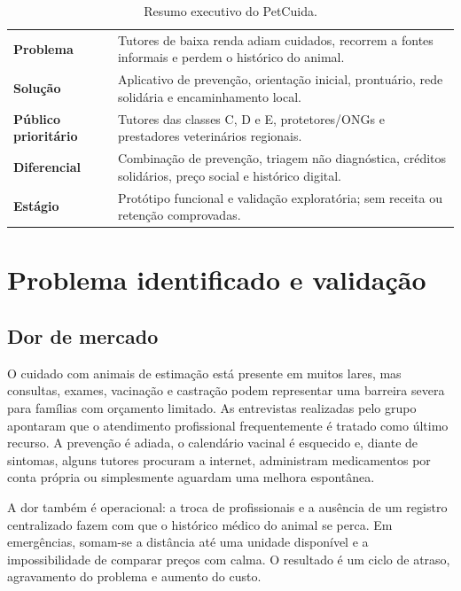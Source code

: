 \documentclass[12pt,a4paper]{article}
\begin{document}
\begin{table}[H]
\centering
\caption{Resumo executivo do PetCuida.}
\begin{tabularx}{\textwidth}{>{\bfseries}p{3.4cm}Y}
\toprule
Problema & Tutores de baixa renda adiam cuidados, recorrem a fontes informais e perdem o histórico do animal.\\
Solução & Aplicativo de prevenção, orientação inicial, prontuário, rede solidária e encaminhamento local.\\
Público prioritário & Tutores das classes C, D e E, protetores/ONGs e prestadores veterinários regionais.\\
Diferencial & Combinação de prevenção, triagem não diagnóstica, créditos solidários, preço social e histórico digital.\\
Estágio & Protótipo funcional e validação exploratória; sem receita ou retenção comprovadas.\\
\bottomrule
\end{tabularx}
\end{table}

\section{Problema identificado e validação}
\subsection{Dor de mercado}
O cuidado com animais de estimação está presente em muitos lares, mas consultas, exames, vacinação e castração podem representar uma barreira severa para famílias com orçamento limitado. As entrevistas realizadas pelo grupo apontaram que o atendimento profissional frequentemente é tratado como último recurso. A prevenção é adiada, o calendário vacinal é esquecido e, diante de sintomas, alguns tutores procuram a internet, administram medicamentos por conta própria ou simplesmente aguardam uma melhora espontânea.

A dor também é operacional: a troca de profissionais e a ausência de um registro centralizado fazem com que o histórico médico do animal se perca. Em emergências, somam-se a distância até uma unidade disponível e a impossibilidade de comparar preços com calma. O resultado é um ciclo de atraso, agravamento do problema e aumento do custo.
\end{document}
